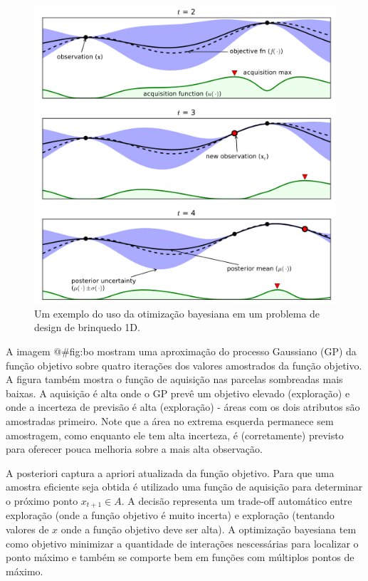 \documentclass[
	12pt,				%
	openright,			%
	twoside,			%
	a4paper,			%
	english,			%
	french,				%
	spanish,			%
	brazil,				%
]{abntex2}
\begin{document}
\begin{figure}
\hypertarget{fig:bo}{%
\centering
\includegraphics{images/bo.png}
\caption{Um exemplo do uso da otimização bayesiana em um problema de
design de brinquedo 1D.}\label{fig:bo}
}
\end{figure}

A imagem @\#fig:bo mostram uma aproximação do processo Gaussiano (GP) da
função objetivo sobre quatro iterações dos valores amostrados da função
objetivo. A figura também mostra o função de aquisição nas parcelas
sombreadas mais baixas. A aquisição é alta onde o GP prevê um objetivo
elevado (exploração) e onde a incerteza de previsão é alta (exploração)
- áreas com os dois atributos são amostradas primeiro. Note que a área
no extrema esquerda permanece sem amostragem, como enquanto ele tem alta
incerteza, é (corretamente) previsto para oferecer pouca melhoria sobre
a mais alta observação.

A posteriori captura a apriori atualizada da função objetivo. Para que
uma amostra eficiente seja obtida é utilizado uma função de aquisição
para determinar o próximo ponto \(x_{t+1} \in A\). A decisão representa
um trade-off automático entre exploração (onde a função objetivo é muito
incerta) e exploração (tentando valores de \(x\) onde a função objetivo
deve ser alta). A optimização bayesiana tem como objetivo minimizar a
quantidade de interações nescessárias para localizar o ponto máximo e
também se comporte bem em funções com múltiplos pontos de máximo.\\
~\\
\end{document}
